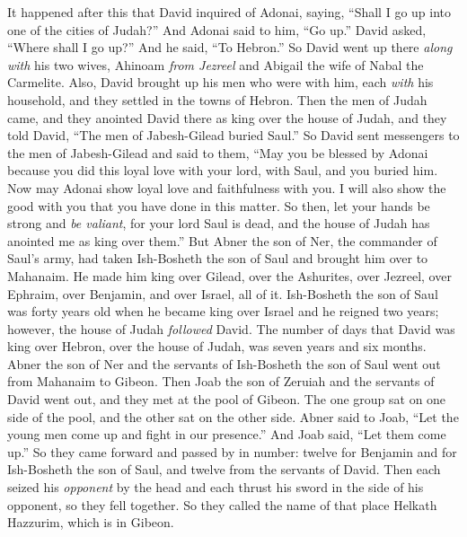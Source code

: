 \begin{biblechapter} %
 It happened after this that David inquired of Adonai, saying, “Shall I go up into one of the cities of Judah?” And Adonai said to him, “Go up.” David asked, “Where shall I go up?” And he said, “To Hebron.”
\verse So David went up there \textit{along with} his two wives, Ahinoam \textit{from Jezreel} and Abigail the wife of Nabal the Carmelite.
\verse Also, David brought up his men who were with him, each \textit{with} his household, and they settled in the towns of Hebron.
 Then the men of Judah came, and they anointed David there as king over the house of Judah, and they told David, “The men of Jabesh-Gilead buried Saul.”
\verse So David sent messengers to the men of Jabesh-Gilead and said to them, “May you be blessed by Adonai because you did this loyal love with your lord, with Saul, and you buried him.
\verse Now may Adonai show loyal love and faithfulness with you. I will also show the good with you that you have done in this matter.
\verse So then, let your hands be strong and \textit{be valiant}, for your lord Saul is dead, and the house of Judah has anointed me as king over them.”
 But Abner the son of Ner, the commander of Saul’s army, had taken Ish-Bosheth the son of Saul and brought him over to Mahanaim.
\verse He made him king over Gilead, over the Ashurites, over Jezreel, over Ephraim, over Benjamin, and over Israel, all of it.
\verse Ish-Bosheth the son of Saul was forty years old when he became king over Israel and he reigned two years; however, the house of Judah \textit{followed} David.
\verse The number of days that David was king over Hebron, over the house of Judah, was seven years and six months.
 Abner the son of Ner and the servants of Ish-Bosheth the son of Saul went out from Mahanaim to Gibeon.
\verse Then Joab the son of Zeruiah and the servants of David went out, and they met at the pool of Gibeon. The one group sat on one side of the pool, and the other sat on the other side.
\verse Abner said to Joab, “Let the young men come up and fight in our presence.” And Joab said, “Let them come up.”
\verse So they came forward and passed by in number: twelve for Benjamin and for Ish-Bosheth the son of Saul, and twelve from the servants of David.
\verse Then each seized his \textit{opponent} by the head and each thrust his sword in the side of his opponent, so they fell together. So they called the name of that place Helkath Hazzurim, which is in Gibeon.

\end{biblechapter}
